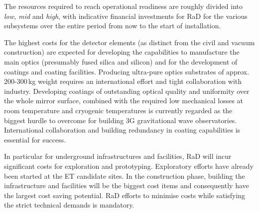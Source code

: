 The resources required to reach operational readiness are roughly divided into \textit{low, mid} and \textit{high}, with indicative financial investments for \ac{RaD} for the various subsystems over the entire period from now to the start of installation. 

The highest costs for the detector elements (as distinct from the civil and vacuum construction) are expected for developing the capabilities to manufacture the main optics (presumably fused silica and silicon) and for the development of coatings and coating facilities. 
Producing ultra-pure optics substrates of approx. 200-300\,kg weight requires an international effort and tight collaboration with industry. Developing coatings of outstanding optical quality and uniformity over the whole mirror surface, combined with the required low mechanical losses at  room temperature and cryogenic temperatures is currently regarded as the biggest hurdle to overcome for building \ac{3G} gravitational wave observatories. International collaboration and building redundancy in coating capabilities is essential for success.

In particular for underground infrastructures and facilities, \ac{RaD} will incur significant costs for exploration and prototyping. Exploratory efforts have already been started at the ET candidate sites. In the construction phase, building the infrastructure and facilities will be the biggest cost items and consequently have the largest cost saving potential. \ac{RaD} efforts to minimise costs while satisfying the strict technical demands is mandatory.




